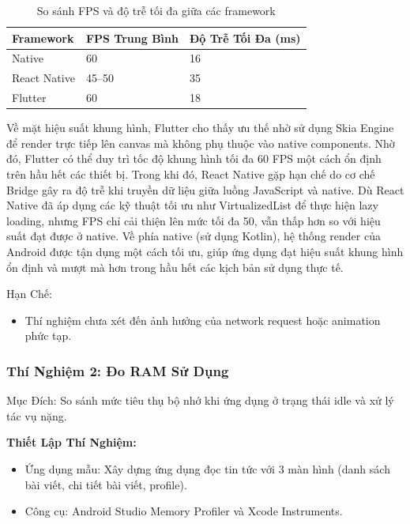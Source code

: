 \vspace{0.5em}

\begin{table}[H]
  \centering
  \begin{tabular}{|l|p{5cm}|p{5cm}|}
  \hline
  \textbf{Framework} & \textbf{FPS Trung Bình} & \textbf{Độ Trễ Tối Đa (ms)} \\
  \hline
  Native       & 60          & 16 \\
  React Native & 45--50      & 35 \\
  Flutter      & 60          & 18 \\
  \hline
  \end{tabular}
  \caption{So sánh FPS và độ trễ tối đa giữa các framework}
  \end{table}
  
  
    Về mặt hiệu suất khung hình, Flutter cho thấy ưu thế nhờ sử dụng Skia Engine để render trực tiếp lên canvas mà không phụ thuộc vào native components. Nhờ đó, Flutter có thể duy trì tốc độ khung hình tối đa 60 FPS một cách ổn định trên hầu hết các thiết bị. Trong khi đó, React Native gặp hạn chế do cơ chế Bridge gây ra độ trễ khi truyền dữ liệu giữa luồng JavaScript và native. Dù React Native đã áp dụng các kỹ thuật tối ưu như VirtualizedList để thực hiện lazy loading, nhưng FPS chỉ cải thiện lên mức tối đa 50, vẫn thấp hơn so với hiệu suất đạt được ở native. Về phía native (sử dụng Kotlin), hệ thống render của Android được tận dụng một cách tối ưu, giúp ứng dụng đạt hiệu suất khung hình ổn định và mượt mà hơn trong hầu hết các kịch bản sử dụng thực tế.
  \vspace{0.5em}
  
  Hạn Chế:
  \setlength{\leftmargini}{1.5cm}
  \begin{itemize}
      \item Thí nghiệm chưa xét đến ảnh hưởng của network request hoặc animation phức tạp.
  \end{itemize}

\subsubsection{Thí Nghiệm 2: Đo RAM Sử Dụng}
    
      Mục Đích: So sánh mức tiêu thụ bộ nhớ khi ứng dụng ở trạng thái idle và xử lý tác vụ nặng.
    \vspace{0.5em}

    
      \textbf{Thiết Lập Thí Nghiệm:}
      \setlength{\leftmargini}{1.5cm}
      \begin{itemize}
        \item Ứng dụng mẫu: Xây dựng ứng dụng đọc tin tức với 3 màn hình (danh sách bài viết, chi tiết bài viết, profile).
        \item Công cụ: Android Studio Memory Profiler và Xcode Instruments.
      \end{itemize}
    
